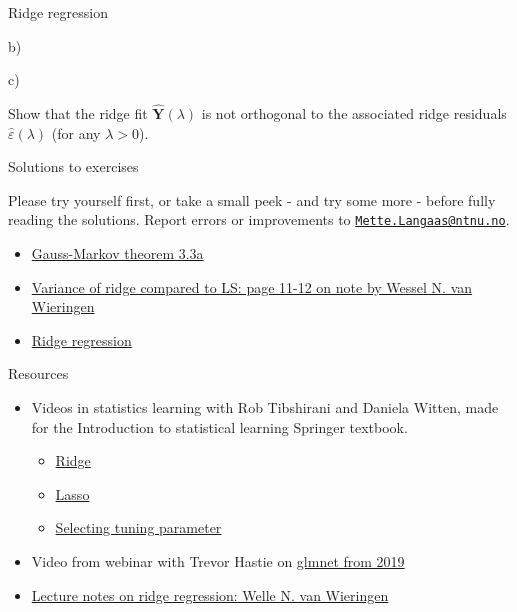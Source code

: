 \documentclass[
  ignorenonframetext,
]{beamer}
\providecommand{\tightlist}{%
  \setlength{\itemsep}{0pt}\setlength{\parskip}{0pt}}
\begin{document}
\begin{frame}
\begin{block}{Ridge regression}
\begin{block}{b)}
\end{block}

\begin{block}{c)}

Show that the ridge fit \(\hat{\mathbf{Y}}(\lambda)\) is not orthogonal
to the associated ridge residuals \(\hat{\varepsilon}(\lambda)\) (for
any \(\lambda > 0\)).

\end{block}

\end{block}

\end{frame}

\begin{frame}{Solutions to exercises}
\protect\hypertarget{solutions-to-exercises}{}

Please try yourself first, or take a small peek - and try some more -
before fully reading the solutions. Report errors or improvements to
\href{mailto:Mette.Langaas@ntnu.no}{\nolinkurl{Mette.Langaas@ntnu.no}}.

\begin{itemize}
\item
  \href{https://github.com/mettelang/MA8701V2021/blob/main/Part1/ELSe33a.pdf}{Gauss-Markov
  theorem 3.3a}
\item
  \href{https://arxiv.org/pdf/1509.09169.pdf}{Variance of ridge compared
  to LS: page 11-12 on note by Wessel N. van Wieringen}
\item
  \href{https://github.com/mettelang/MA8701V2021/blob/main/Part1/L2exRR1.html}{Ridge
  regression}
\end{itemize}

\end{frame}

\begin{frame}{Resources}
\protect\hypertarget{resources}{}

\begin{itemize}
\item
  Videos in statistics learning with Rob Tibshirani and Daniela Witten,
  made for the Introduction to statistical learning Springer textbook.

  \begin{itemize}
  \tightlist
  \item
    \href{https://www.youtube.com/watch?v=cSKzqb0EKS0}{Ridge}
  \item
    \href{https://www.youtube.com/watch?v=A5I1G1MfUmA}{Lasso}
  \item
    \href{https://www.youtube.com/watch?v=xMKVUstjXBE}{Selecting tuning
    parameter}
  \end{itemize}
\item
  Video from webinar with Trevor Hastie on
  \href{http://youtu.be/BU2gjoLPfDc}{glmnet from 2019}
\item
  \href{https://arxiv.org/pdf/1509.09169.pdf}{Lecture notes on ridge
  regression: Welle N. van Wieringen}
\end{itemize}

\end{frame}
\end{document}
